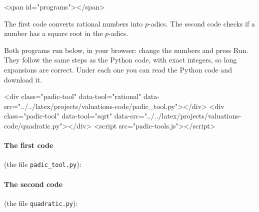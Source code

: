 \documentclass[11pt]{article}
\begin{document}
\begin{rawhtml}
<span id="programs"></span>
\end{rawhtml}

The first code converts rational numbers into $p$-adics. The second code checks if a number has a square root in the $p$-adics.

\begin{webonly}
Both programs run below, in your browser: change the numbers and press Run. They follow the same steps as the Python code, with exact integers, so long expansions are correct. Under each one you can read the Python code and download it.
\end{webonly}

\begin{rawhtml}
<div class="padic-tool" data-tool="rational" data-src="../../latex/projects/valuations-code/padic_tool.py"></div>
<div class="padic-tool" data-tool="sqrt" data-src="../../latex/projects/valuations-code/quadratic.py"></div>
<script src="padic-tools.js"></script>
\end{rawhtml}

\begin{pdfonly}
\paragraph{The first code} (the file \texttt{padic\_tool.py}):


\paragraph{The second code} (the file \texttt{quadratic.py}):

\end{pdfonly}
\end{document}
